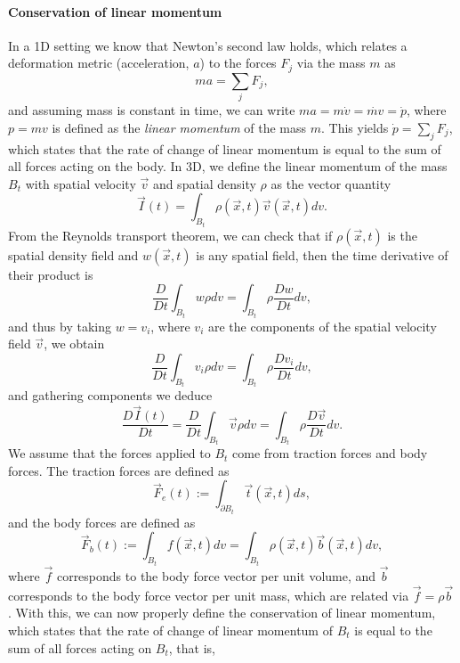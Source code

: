 \paragraph{Conservation of linear momentum} In a 1D setting we know that Newton's second law holds, which relates a deformation metric (acceleration, $a$) to the forces $F_j$ via the mass $m$ as 
\begin{equation*}
    ma = \sum_j F_j,
\end{equation*}
and assuming mass is constant in time, we can write $ma = m\dot{v} = \dot{mv} = \dot{p}$, where $p=mv$ is defined as the \textit{linear momentum} of the mass $m$. This yields $\dot{p} = \sum_j F_j$, which states that the rate of change of linear momentum is equal to the sum of all forces acting on the body. In 3D, we define the linear momentum of the mass $B_t$ with spatial velocity $\vec v$ and spatial density $\rho$ as the vector quantity
\begin{equation*}
    \vec I(t) = \int_{B_t} \rho(\vec x, t) \vec v(\vec x, t) dv.
\end{equation*}
From the Reynolds transport theorem, we can check that if $\rho(\vec x, t)$ is the spatial density field and $w(\vec x, t)$ is any spatial field, then the time derivative of their product is 
\begin{equation*}
    \frac{D}{Dt} \int_{B_t} w\rho dv = \int_{B_t} \rho \frac{Dw}{Dt} dv,
\end{equation*}
and thus by taking $w=v_i$, where $v_i$ are the components of the spatial velocity field $\vec v$, we obtain
\begin{equation*}
    \frac{D}{Dt} \int_{B_t} v_i\rho dv = \int_{B_t} \rho \frac{Dv_i}{Dt} dv,
\end{equation*}
and gathering components we deduce
\begin{equation*}
    \frac{D\vec I(t)}{Dt} = \frac{D}{Dt} \int_{B_t} \vec v \rho dv = \int_{B_t} \rho \frac{D\vec v}{Dt} dv.
\end{equation*}
We assume that the forces applied to $B_t$ come from traction forces and body forces. The traction forces are defined as 
\begin{equation*}
    \vec F_{e} (t) := \int_{\partial B_t} \vec t(\vec x, t) ds,
\end{equation*}
and the body forces are defined as 
\begin{equation*}
    \vec F_b(t) := \int_{B_t} f(\vec x, t) dv = \int_{B_t} \rho(\vec x, t) \vec b(\vec x, t)dv,
\end{equation*}
where $\vec f$ corresponds to the body force vector per unit volume, and $\vec b$ corresponds to the body force vector per unit mass, which are related via $\vec f = \rho\vec b$. With this, we can now properly define the conservation of linear momentum, which states that the rate of change of linear momentum of $B_t$ is equal to the sum of all forces acting on $B_t$, that is,
